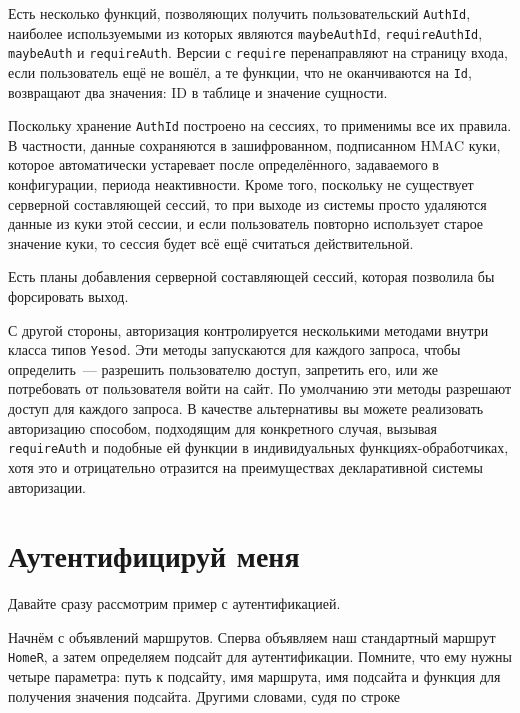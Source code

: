 Есть несколько функций, позволяющих получить пользовательский \lstinline'AuthId', наиболее используемыми из которых являются \lstinline'maybeAuthId', \lstinline'requireAuthId', \lstinline'maybeAuth' и \lstinline'requireAuth'. Версии с \lstinline'require' перенаправляют на страницу входа, если пользователь ещё не вошёл, а те функции, что не оканчиваются на \lstinline'Id', возвращают два значения: ID в таблице и значение сущности.

Поскольку хранение \lstinline'AuthId' построено на сессиях, то применимы все их правила. В частности, данные сохраняются в зашифрованном, подписанном HMAC куки, которое автоматически устаревает после определённого, задаваемого в конфигурации, периода неактивности. Кроме того, поскольку не существует серверной составляющей сессий, то при выходе из системы просто удаляются данные из куки этой сессии, и если пользователь повторно использует старое значение куки, то сессия будет всё ещё считаться действительной.

\begin{remark}
    Есть планы добавления серверной составляющей сессий, которая позволила бы форсировать выход.
\end{remark}

С другой стороны, авторизация контролируется несколькими методами внутри класса типов \lstinline'Yesod'. Эти методы запускаются для каждого запроса, чтобы определить~--- разрешить пользователю доступ, запретить его, или же потребовать от пользователя войти на сайт. По умолчанию эти методы разрешают доступ для каждого запроса. В качестве альтернативы вы можете реализовать авторизацию способом, подходящим для конкретного случая, вызывая \lstinline'requireAuth' и подобные ей функции в индивидуальных функциях-обработчиках, хотя это и отрицательно отразится на преимуществах декларативной системы авторизации.

\section{Аутентифицируй меня}

Давайте сразу рассмотрим пример с аутентификацией.


Начнём с объявлений маршрутов. Сперва объявляем наш стандартный маршрут \lstinline'HomeR', а затем определяем подсайт для аутентификации. Помните, что ему нужны четыре параметра: путь к подсайту, имя маршрута, имя подсайта и функция для получения значения подсайта. Другими словами, судя по строке

